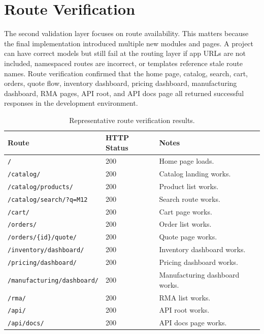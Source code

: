 \documentclass[12pt,letterpaper,oneside,openany]{book}
\begin{document}
\section{Route Verification}

\begin{justifying}
The second validation layer focuses on route availability. This matters because
the final implementation introduced multiple new modules and pages. A project
can have correct models but still fail at the routing layer if app URLs are not
included, namespaced routes are incorrect, or templates reference stale route
names. Route verification confirmed that the home page, catalog, search, cart,
orders, quote flow, inventory dashboard, pricing dashboard, manufacturing
dashboard, RMA pages, API root, and API docs page all returned successful
responses in the development environment.
\end{justifying}

\begin{table}[H]
\centering
\begin{tabular}{|p{2.8in}|p{0.8in}|p{2.2in}|}
\hline
\textbf{Route} & \textbf{HTTP Status} & \textbf{Notes} \\ \hline
\texttt{/} & 200 & Home page loads. \\ \hline
\texttt{/catalog/} & 200 & Catalog landing works. \\ \hline
\texttt{/catalog/products/} & 200 & Product list works. \\ \hline
\texttt{/catalog/search/?q=M12} & 200 & Search route works. \\ \hline
\texttt{/cart/} & 200 & Cart page works. \\ \hline
\texttt{/orders/} & 200 & Order list works. \\ \hline
\texttt{/orders/\{id\}/quote/} & 200 & Quote page works. \\ \hline
\texttt{/inventory/dashboard/} & 200 & Inventory dashboard works. \\ \hline
\texttt{/pricing/dashboard/} & 200 & Pricing dashboard works. \\ \hline
\texttt{/manufacturing/dashboard/} & 200 & Manufacturing dashboard works. \\ \hline
\texttt{/rma/} & 200 & RMA list works. \\ \hline
\texttt{/api/} & 200 & API root works. \\ \hline
\texttt{/api/docs/} & 200 & API docs page works. \\ \hline
\end{tabular}
\caption{Representative route verification results.}
\label{tab:routechecks}
\end{table}
\end{document}
